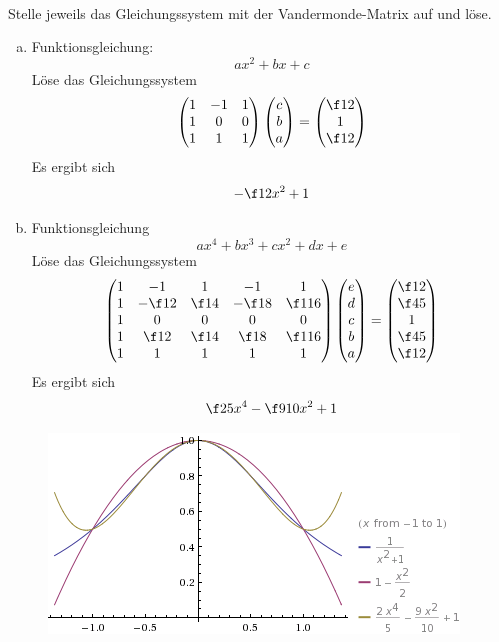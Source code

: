 \documentclass{mywork}
\begin{document}
	\begin{aufgabe}~

		Stelle jeweils das Gleichungssystem mit der Vandermonde-Matrix auf und löse.
		\begin{enumerate}[a)]
			\item
				Funktionsgleichung:
				\[
					ax^2 + bx + c
				\]
				Löse das Gleichungssystem
				\[
					\begin{pmatrix}1&-1&1\\1&0&0\\1&1&1\end{pmatrix}\begin{pmatrix}c\\b\\a\end{pmatrix}= \begin{pmatrix}\f12\\1\\\f12\end{pmatrix}
				\]
				Es ergibt sich
				\[
					-\f12x^2 + 1
				\]
			\item
				Funktionsgleichung
				\[
					ax^4+bx^3+cx^2+dx+e
				\]
				Löse das Gleichungssystem
				\[
					\begin{pmatrix}1&-1&1&-1&1\\1&-\f12&\f14&-\f18&\f1{16}\\1&0&0&0&0\\1&\f12&\f14&\f18&\f1{16}\\1&1&1&1&1\end{pmatrix}\begin{pmatrix}e\\d\\c\\b\\a\end{pmatrix}= \begin{pmatrix}\f 12\\\f45\\1\\\f45\\\f12\end{pmatrix}
				\]
				Es ergibt sich
				\[
					\f25 x^4 - \f 9{10}x^2 + 1
				\]
		\end{enumerate}  		
		\begin{figure}[htb]
				\centering
				\includegraphics[scale=0.7]{nla_6_1.png}
			\end{figure} 
 	\end{aufgabe}
	
\end{document}
